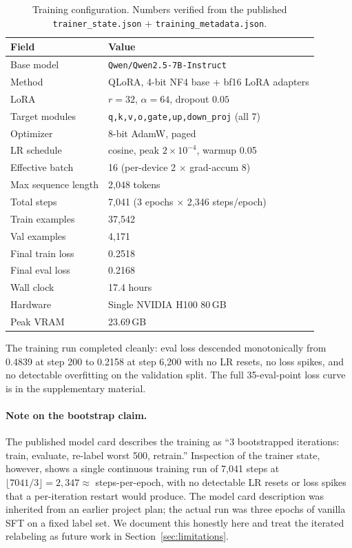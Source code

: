 \documentclass[10pt,letterpaper]{article}
\begin{document}
\begin{table}[!ht]
\centering
\small
\caption{Training configuration. Numbers verified from the published \texttt{trainer\_state.json} + \texttt{training\_metadata.json}.}
\label{tab:train}
\begin{tabular}{ll}
\toprule
\textbf{Field} & \textbf{Value} \\
\midrule
Base model           & \texttt{Qwen/Qwen2.5-7B-Instruct} \\
Method               & QLoRA, 4-bit NF4 base + bf16 LoRA adapters \\
LoRA                 & $r=32$, $\alpha=64$, dropout $0.05$ \\
Target modules       & \texttt{q,k,v,o,gate,up,down\_proj} (all 7) \\
Optimizer            & 8-bit AdamW, paged \\
LR schedule          & cosine, peak $2 \times 10^{-4}$, warmup 0.05 \\
Effective batch      & 16 (per-device 2 $\times$ grad-accum 8) \\
Max sequence length  & 2{,}048 tokens \\
Total steps          & 7{,}041 (3 epochs $\times$ 2{,}346 steps/epoch) \\
Train examples       & 37{,}542 \\
Val examples         & 4{,}171 \\
Final train loss     & 0.2518 \\
Final eval loss      & 0.2168 \\
Wall clock           & 17.4 hours \\
Hardware             & Single NVIDIA H100 80\,GB \\
Peak VRAM            & 23.69\,GB \\
\bottomrule
\end{tabular}
\end{table}

The training run completed cleanly: eval loss descended monotonically from 0.4839 at step 200 to 0.2158 at step 6{,}200 with no LR resets, no loss spikes, and no detectable overfitting on the validation split. The full 35-eval-point loss curve is in the supplementary material.

\paragraph{Note on the bootstrap claim.} The published model card describes the training as ``3 bootstrapped iterations: train, evaluate, re-label worst 500, retrain.'' Inspection of the trainer state, however, shows a single continuous training run of 7{,}041 steps at $\lfloor 7041 / 3 \rfloor = 2{,}347 \approx$ steps-per-epoch, with no detectable LR resets or loss spikes that a per-iteration restart would produce. The model card description was inherited from an earlier project plan; the actual run was three epochs of vanilla SFT on a fixed label set. We document this honestly here and treat the iterated relabeling as future work in Section~\ref{sec:limitations}.
\end{document}

